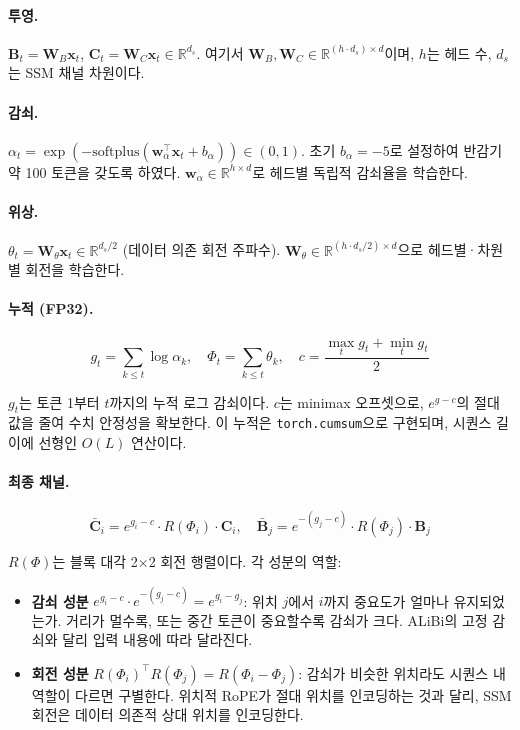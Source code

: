 \documentclass[11pt]{article}
\begin{document}
\paragraph{투영.} $\mathbf{B}_t = \mathbf{W}_B \mathbf{x}_t$, $\mathbf{C}_t = \mathbf{W}_C \mathbf{x}_t \in \mathbb{R}^{d_s}$. 여기서 $\mathbf{W}_B, \mathbf{W}_C \in \mathbb{R}^{(h \cdot d_s) \times d}$이며, $h$는 헤드 수, $d_s$는 SSM 채널 차원이다.

\paragraph{감쇠.} $\alpha_t = \exp(-\text{softplus}(\mathbf{w}_\alpha^\top \mathbf{x}_t + b_\alpha)) \in (0, 1)$.
초기 $b_\alpha = -5$로 설정하여 반감기 약 100 토큰을 갖도록 하였다. $\mathbf{w}_\alpha \in \mathbb{R}^{h \times d}$로 헤드별 독립적 감쇠율을 학습한다.

\paragraph{위상.} $\theta_t = \mathbf{W}_\theta \mathbf{x}_t \in \mathbb{R}^{d_s/2}$ (데이터 의존 회전 주파수). $\mathbf{W}_\theta \in \mathbb{R}^{(h \cdot d_s/2) \times d}$으로 헤드별·차원별 회전을 학습한다.

\paragraph{누적 (FP32).}
\begin{equation}
g_t = \textstyle\sum_{k \leq t} \log \alpha_k, \quad \Phi_t = \textstyle\sum_{k \leq t} \theta_k, \quad c = \frac{\max_t g_t + \min_t g_t}{2}
\end{equation}

$g_t$는 토큰 1부터 $t$까지의 누적 로그 감쇠이다. $c$는 minimax 오프셋으로, $e^{g-c}$의 절대값을 줄여 수치 안정성을 확보한다. 이 누적은 \texttt{torch.cumsum}으로 구현되며, 시퀀스 길이에 선형인 $O(L)$ 연산이다.

\paragraph{최종 채널.}
\begin{equation}
\bar{\mathbf{C}}_i = e^{g_i - c} \cdot R(\Phi_i) \cdot \mathbf{C}_i, \quad
\bar{\mathbf{B}}_j = e^{-(g_j - c)} \cdot R(\Phi_j) \cdot \mathbf{B}_j
\end{equation}

$R(\Phi)$는 블록 대각 2$\times$2 회전 행렬이다. 각 성분의 역할:
\begin{itemize}[leftmargin=*]
\item \textbf{감쇠 성분} $e^{g_i-c} \cdot e^{-(g_j-c)} = e^{g_i - g_j}$: 위치 $j$에서 $i$까지 중요도가 얼마나 유지되었는가. 거리가 멀수록, 또는 중간 토큰이 중요할수록 감쇠가 크다. ALiBi의 고정 감쇠와 달리 입력 내용에 따라 달라진다.
\item \textbf{회전 성분} $R(\Phi_i)^\top R(\Phi_j) = R(\Phi_i - \Phi_j)$: 감쇠가 비슷한 위치라도 시퀀스 내 역할이 다르면 구별한다. 위치적 RoPE가 절대 위치를 인코딩하는 것과 달리, SSM 회전은 데이터 의존적 상대 위치를 인코딩한다.
\end{itemize}
\end{document}
